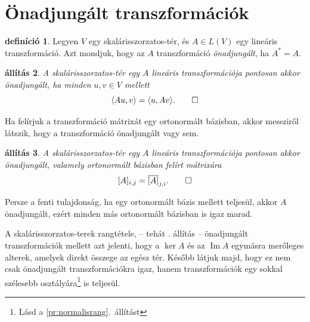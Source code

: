 \documentclass[a4paper, showtrims]{memoir}
\theoremstyle{plain}
\newtheorem{proposition}{állítás}[chapter]
\theoremstyle{remark}
\theoremstyle{definition}
\newtheorem{definition}[proposition]{definíció}
\DeclareMathOperator{\im}{Im}
\newcommand{\ip}[2]{\langle#1,#2\rangle}
\begin{document}
\section{Önadjungált transzformációk}
\begin{definition}
	Legyen $V$ egy skalárisszorzatos-tér, és $A\in L\left( V \right)$ egy lineáris transzformáció.
	Azt mondjuk, hogy az $A$ transzformáció
	\emph{önadjungált},
	ha $A^\ast=A$.
\end{definition}

\begin{proposition}
	A skalárisszorzatos-tér egy $A$ lineáris transzformációja pontosan akkor önadjungált,
	ha minden $u,v\in V$ mellett
	\[
		\ip{Au}{v}
		=
		\ip{u}{Av}.
		\qedhere
	\]
\end{proposition}
Ha felírjuk a transzformáció mátrixát egy ortonormált bázisban, akkor messziről látszik,
hogy a transzformáció önadjungált vagy sem.
\begin{proposition}
	A skalárisszorzatos-tér egy $A$ lineáris transzformációja pontosan akkor önadjungált,
	valamely ortonormált bázisban felírt mátrixára
	\[
		[A]_{i,j}=\overline{[A]}_{j,i}.
		\qedhere
	\]
\end{proposition}
Persze a fenti tulajdonság, ha egy ortonormált bázis mellett teljesül,
akkor $A$ önadjungált, ezért minden más ortonormált bázisban is igaz marad.

A skalárisszorzatos-terek rangtétele, -- tehát . állítás -- önadjungált transzformációk mellett azt jelenti,
hogy
a $\ker A$ és az $\im A$ egymásra merőleges alterek,
amelyek direkt összege az egész tér.
Később látjuk majd, hogy ez nem csak önadjungált transzformációkra igaz,
hanem transzformációk egy sokkal szélesebb osztályára\footnote{Lásd a \ref{pr:normalisrang}.~állítást} is teljesül.
\end{document}
